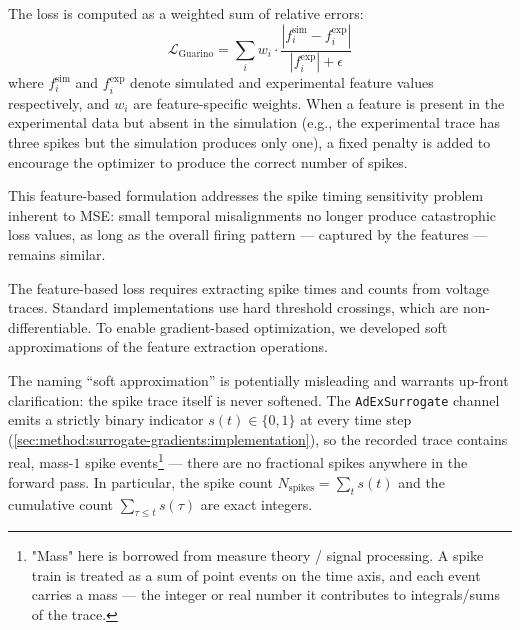The loss is computed as a weighted sum of relative errors:
\begin{equation}\label{eq:guarino}
    \mathcal{L}_{\text{Guarino}} = \sum_i w_i \cdot \frac{|f_i^{\text{sim}} - f_i^{\text{exp}}|}{|f_i^{\text{exp}}| + \epsilon}
\end{equation}
where $f_i^{\text{sim}}$ and $f_i^{\text{exp}}$ denote simulated and experimental feature values respectively,
and $w_i$ are feature-specific weights.
When a feature is present in the experimental data but absent in the simulation
(e.g., the experimental trace has three spikes but the simulation produces only one),
a fixed penalty is added to encourage the optimizer to produce the correct number of spikes.

This feature-based formulation addresses the spike timing sensitivity problem inherent to MSE:
small temporal misalignments no longer produce catastrophic loss values,
as long as the overall firing pattern --- captured by the features --- remains similar.

The feature-based loss requires extracting spike times and counts from voltage traces.
Standard implementations use hard threshold crossings, which are non-differentiable.
To enable gradient-based optimization, we developed soft approximations of the feature extraction operations.

The naming ``soft approximation'' is potentially misleading and warrants up-front clarification: the spike trace itself is never softened.
The \texttt{AdExSurrogate} channel emits a strictly binary indicator $s(t)\in\{0,1\}$ at every time step (\cref{sec:method:surrogate-gradients:implementation}),
so the recorded trace contains real, mass-$1$ spike events\footnote{
"Mass" here is borrowed from measure theory / signal processing.
A spike train is treated as a sum of point events on the time axis, and each event carries a mass --- the integer or real number it contributes to integrals/sums of the trace.}
--- there are no fractional spikes anywhere in the forward pass.
In particular, the spike count $N_{\text{spikes}} = \sum_{t} s(t)$ and the cumulative count $\sum_{\tau\leq t} s(\tau)$ are exact integers.

